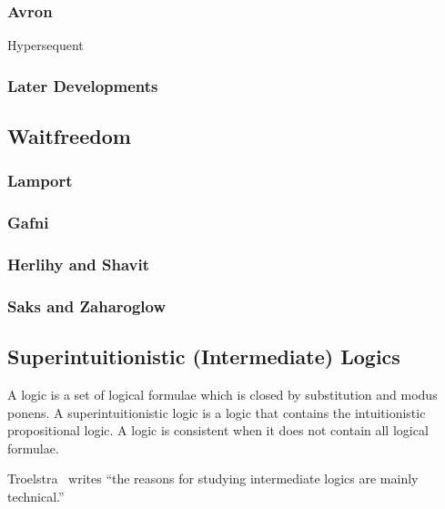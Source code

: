 \subsubsection{Avron}
Hypersequent


\subsubsection{Later Developments}

\subsection{Waitfreedom}

\subsubsection{Lamport}

\subsubsection{Gafni}

\subsubsection{Herlihy and Shavit}

\subsubsection{Saks and Zaharoglow}

\subsection{Superintuitionistic (Intermediate) Logics}

A logic is a set of logical formulae which is closed by
substitution and modus ponens.
 A superintuitionistic logic is a logic
that contains the intuitionistic propositional logic.  A logic is consistent when it does not
contain all logical formulae.

Troelstra~\cite[p.~223]{goedelcollected} writes ``the reasons
for studying intermediate logics are mainly technical.''

